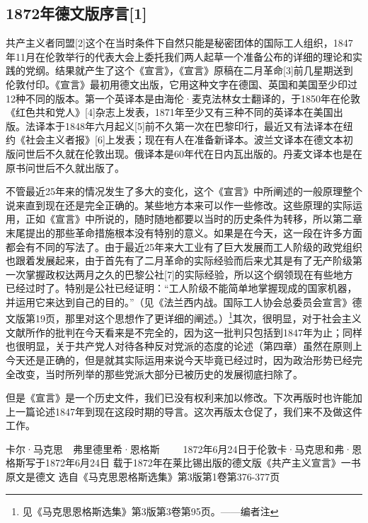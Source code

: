 \documentclass[UTF8,zihao=-4,a4paper]{ctexart}
\begin{document}
\subsection*{1872年德文版序言[1]}
共产主义者同盟[2]这个在当时条件下自然只能是秘密团体的国际工人组织，1847年11月在伦敦举行的代表大会上委托我们两人起草一个准备公布的详细的理论和实践的党纲。结果就产生了这个《宣言》，《宣言》原稿在二月革命[3]前几星期送到伦敦付印。《宣言》最初用德文出版，它用这种文字在德国、英国和美国至少印过12种不同的版本。第一个英译本是由海伦·麦克法林女士翻译的，于1850年在伦敦《红色共和党人》[4]杂志上发表，1871年至少又有三种不同的英译本在美国出版。法译本于1848年六月起义[5]前不久第一次在巴黎印行，最近又有法译本在纽约《社会主义者报》[6]上发表；现在有人在准备新译本。波兰文译本在德文本初版问世后不久就在伦敦出现。俄译本是60年代在日内瓦出版的。丹麦文译本也是在原书问世后不久就出版了。\par
不管最近25年来的情况发生了多大的变化，这个《宣言》中所阐述的一般原理整个说来直到现在还是完全正确的。某些地方本来可以作一些修改。这些原理的实际运用，正如《宣言》中所说的，随时随地都要以当时的历史条件为转移，所以第二章末尾提出的那些革命措施根本没有特别的意义。如果是在今天，这一段在许多方面都会有不同的写法了。由于最近25年来大工业有了巨大发展而工人阶级的政党组织也跟着发展起来，由于首先有了二月革命的实际经验而后来尤其是有了无产阶级第一次掌握政权达两月之久的巴黎公社[7]的实际经验，所以这个纲领现在有些地方已经过时了。特别是公社已经证明：“工人阶级不能简单地掌握现成的国家机器，并运用它来达到自己的目的。”（见《法兰西内战。国际工人协会总委员会宣言》德文版第19页，那里对这个思想作了更详细的阐述。）\footnote{见《马克思恩格斯选集》第3版第3卷第95页。——编者注}其次，很明显，对于社会主义文献所作的批判在今天看来是不完全的，因为这一批判只包括到1847年为止；同样也很明显，关于共产党人对待各种反对党派的态度的论述（第四章）虽然在原则上今天还是正确的，但是就其实际运用来说今天毕竟已经过时，因为政治形势已经完全改变，当时所列举的那些党派大部分已被历史的发展彻底扫除了。\par
但是《宣言》是一个历史文件，我们已没有权利来加以修改。下次再版时也许能加上一篇论述1847年到现在这段时期的导言。这次再版太仓促了，我们来不及做这件工作。\par
卡尔·马克思　弗里德里希·恩格斯 
 　　1872年6月24日于伦敦卡·马克思和弗·恩格斯写于1872年6月24日 
 载于1872年在莱比锡出版的德文版《共产主义宣言》一书原文是德文 
 选自《马克思恩格斯选集》第3版第1卷第376-377页\par
\end{document}
